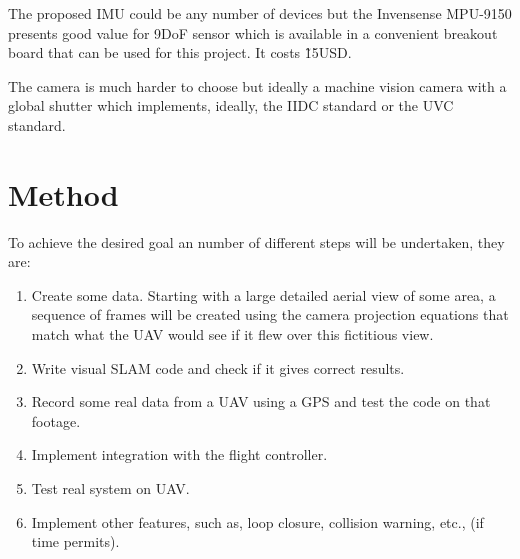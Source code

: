 \documentclass[a4paper,12pt]{article}
\begin{document}
The proposed IMU could be any number of devices but the Invensense MPU-9150 presents good value for 9DoF sensor which is available in a convenient breakout board that can be used for this project. It costs \~15USD.

The camera is much harder to choose but ideally a machine vision camera with a global shutter which implements, ideally, the IIDC standard or the UVC standard.

\section{Method\label{method}}
To achieve the desired goal an number of different steps will be undertaken, they are:
\begin{enumerate}
	\item Create some data. Starting with a large detailed aerial view of some area, a sequence of frames will be created using the camera projection equations that match what the UAV would see if it flew over this fictitious view.
	\item Write visual SLAM code and check if it gives correct results.
	\item Record some real data from a UAV using a GPS and test the code on that footage.
	\item Implement integration with the flight controller.
	\item Test real system on UAV.
	\item Implement other features, such as, loop closure, collision warning, etc., (if time permits).
\end{enumerate}


%

\end{document}
